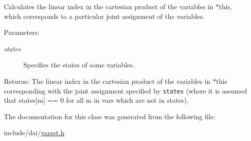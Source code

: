 Calculates the linear index in the cartesian product of the variables in $\ast$this, which corresponds to a particular joint assignment of the variables. 

\begin{Desc}
\item[Parameters:]
\begin{description}
\item[{\em states}]Specifies the states of some variables. \end{description}
\end{Desc}
\begin{Desc}
\item[Returns:]The linear index in the cartesian product of the variables in $\ast$this corresponding with the joint assignment specified by {\tt states} (where it is assumed that states\mbox{[}m\mbox{]} == 0 for all m in vars which are not in states). \end{Desc}


The documentation for this class was generated from the following file:\begin{CompactItemize}
\item 
include/dai/\hyperlink{varset_8h}{varset.h}\end{CompactItemize}
